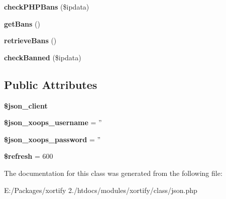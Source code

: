 \begin{DoxyCompactItemize}
\item 
\hypertarget{class_j_s_o_n_xortify_exchange_ae2454f7bceb92e9a841a5b534df0ddad}{{\bfseries check\-P\-H\-P\-Bans} (\$ipdata)}\label{class_j_s_o_n_xortify_exchange_ae2454f7bceb92e9a841a5b534df0ddad}

\item 
\hypertarget{class_j_s_o_n_xortify_exchange_abed88818d5ac42c8f7aa199612e063ff}{{\bfseries get\-Bans} ()}\label{class_j_s_o_n_xortify_exchange_abed88818d5ac42c8f7aa199612e063ff}

\item 
\hypertarget{class_j_s_o_n_xortify_exchange_a259b2839241b55429573235c82678ff2}{{\bfseries retrieve\-Bans} ()}\label{class_j_s_o_n_xortify_exchange_a259b2839241b55429573235c82678ff2}

\item 
\hypertarget{class_j_s_o_n_xortify_exchange_ac67a61967470681257f34a95d208e058}{{\bfseries check\-Banned} (\$ipdata)}\label{class_j_s_o_n_xortify_exchange_ac67a61967470681257f34a95d208e058}

\end{DoxyCompactItemize}
\subsection*{Public Attributes}
\begin{DoxyCompactItemize}
\item 
\hypertarget{class_j_s_o_n_xortify_exchange_a50ce0f2d60e1bae52bf757ec315e9a3e}{{\bfseries \$json\-\_\-client}}\label{class_j_s_o_n_xortify_exchange_a50ce0f2d60e1bae52bf757ec315e9a3e}

\item 
\hypertarget{class_j_s_o_n_xortify_exchange_ac0341689cec6a7b4be737ad8ef64653a}{{\bfseries \$json\-\_\-xoops\-\_\-username} = ''}\label{class_j_s_o_n_xortify_exchange_ac0341689cec6a7b4be737ad8ef64653a}

\item 
\hypertarget{class_j_s_o_n_xortify_exchange_ad262e88c40aa39310bd65bc4d1f97009}{{\bfseries \$json\-\_\-xoops\-\_\-password} = ''}\label{class_j_s_o_n_xortify_exchange_ad262e88c40aa39310bd65bc4d1f97009}

\item 
\hypertarget{class_j_s_o_n_xortify_exchange_aec9e7466612fa2a256570db71731be52}{{\bfseries \$refresh} = 600}\label{class_j_s_o_n_xortify_exchange_aec9e7466612fa2a256570db71731be52}

\end{DoxyCompactItemize}


The documentation for this class was generated from the following file\-:\begin{DoxyCompactItemize}
\item 
E\-:/\-Packages/xortify 2./htdocs/modules/xortify/class/json.\-php\end{DoxyCompactItemize}
